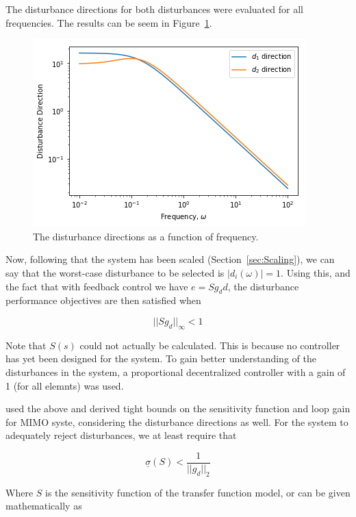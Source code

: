 The disturbance directions for both disturbances were evaluated for all frequencies. The results can be seem in Figure~\ref{fig:disturbance-direction}.

\begin{figure}[H]
	\centering
	\includegraphics[width=0.7\linewidth]{"Figures/Disturbance Direction"}
	\caption{The disturbance directions as a function of frequency.}
	\label{fig:disturbance-direction}
\end{figure}

Now, following that the system has been scaled (Section~\ref{sec:Scaling}), we can say that the worst-case disturbance to be selected is $|d_i(\omega)| = 1$. Using this, and the fact that with feedback control we have $e = Sg_dd$, the disturbance performance objectives are then satisfied when

\begin{equation}
	||Sg_d||_{\infty} < 1
\end{equation}

Note that $S(s)$ could not actually be calculated. This is because no controller has yet been designed for the system. To gain better understanding of the disturbances in the system, a proportional decentralized controller with a gain of 1 (for all elemnts) was used.

\textcite{skogestad} used the above and derived tight bounds on the sensitivity function and loop gain for MIMO syste, considering the disturbance directions as well. For the system to adequately reject disturbances, we at least require that 

\begin{equation}
	\label{eq: Disturbance Criteria 1}
	\underline{\sigma}(S) < \frac{1}{||g_d||_2}
\end{equation}

Where $S$ is the sensitivity function of the transfer function model, or can be given mathematically as 

